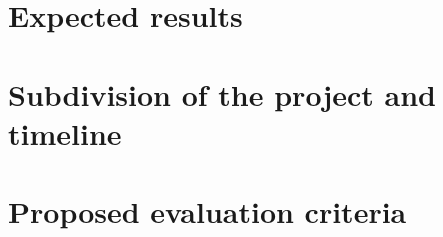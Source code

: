 \documentclass[12pt, a4paper]{article}
\begin{document}
\section{Expected results}\label{sec:expected-results}


\section{Subdivision of the project and timeline}\label{sec:subdivision-of-the-project-and-timeline}


\section{Proposed evaluation criteria}\label{sec:proposed-evaluation-criteria}




\end{document}
